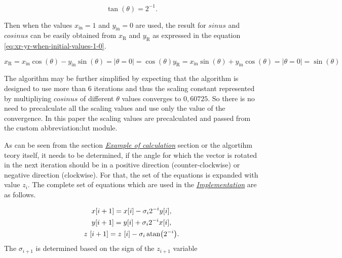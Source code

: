 \documentclass[a4paper, twoside, 11pt]{article}
\begin{document}
        \begin{equation}\label{eq:tan-theta-2}
            \tan (\theta) = 2^{-1}.
        \end{equation}
        \par
        Then when the values $x_\text{in} = 1$ and $y_\text{in} = 0$ are used, the result for $sinus$ and $cosinus$ can be easily obtained from $x_\text{R}$ and $y_\text{R}$ as expressed in the equation \ref{eq:xr-yr-when-initial-values-1-0}.

        \begin{equation}\label{eq:xr-yr-when-initial-values-1-0}
            x_\text{R} = x_\text{in} \cos (\theta) - y_\text{in} \sin (\theta) = | \theta = 0 | = \cos (\theta)
            y_\text{R} = x_\text{in} \sin (\theta) + y_\text{in} \cos (\theta) = | \theta = 0 | = \sin (\theta)
        \end{equation}

            The algorithm may be further simplified by expecting that the algorithm is designed to use more than 6 iterations and thus the scaling constant represented by multipliying $cosinus$ of different $\theta$ values converges to $0,60725$. So there is no need to precalculate all the scaling values and use only the value of the convergence. In this paper the scaling values are precalculated and passed from the custom \gls{abbreviation:lut} module.\par
            As can be seen from the section \hyperref[subsubsec:example-of-calculation]{\textit{Example of calculation}} section or the algortihm teory itself, it needs to be determined, if the angle for which the vector is rotated in the next iteration should be in a positive direction (counter-clockwise) or negative direction (clockwise). For that, the set of the equations is expanded with value $z_i$. The complete set of equations which are used in the \hyperref[subsec:cordic-implementation]{\textit{Implementation}} are as follows.

            \begin{equation}
                \begin{gathered}
                x [i+1] = x [i] - \sigma_i 2^{-i} y[i],\\
                y [i+1] = y [i] + \sigma_i 2^{-i} x[i],\\
                z~[i+1] = z~[i] - \sigma_i \atan (2^{-i}).
                \end{gathered}
            \end{equation}
            The $\sigma_{i+1}$ is determined based on the sign of the $z_{i+1}$ variable
\end{document}
